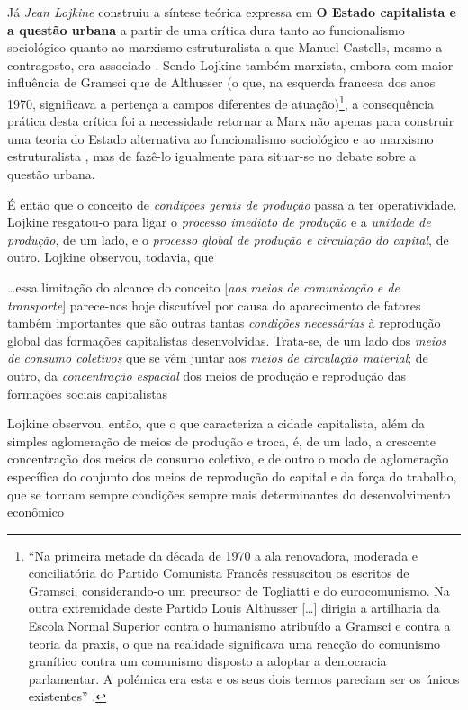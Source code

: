 Já \textit{Jean Lojkine} construiu a síntese teórica expressa em \textbf{O Estado capitalista e a questão urbana} a partir de uma crítica dura tanto ao funcionalismo sociológico quanto ao marxismo estruturalista a que Manuel Castells, mesmo a contragosto, era associado \cite[p.~79-105]{LOJKINE1997}. Sendo Lojkine também marxista, embora com maior influência de Gramsci que de Althusser (o que, na esquerda francesa dos anos 1970, significava a pertença a campos diferentes de atuação)\footnote{``Na primeira metade da década de 1970 a ala renovadora, moderada e conciliatória do Partido Comunista Francês ressuscitou os escritos de Gramsci, considerando-o um precursor de Togliatti e do eurocomunismo. Na outra extremidade deste Partido Louis Althusser [\dots] dirigia a artilharia da Escola Normal Superior contra o humanismo atribuído a Gramsci e contra a teoria da praxis, o que na realidade significava uma reacção do comunismo granítico contra um comunismo disposto a adoptar a democracia parlamentar. A polémica era esta e os seus dois termos pareciam ser os únicos existentes'' \cite{MANOLOBERNARDO2012}.}, a consequência prática desta crítica foi a necessidade retornar a Marx não apenas para construir uma teoria do Estado alternativa ao funcionalismo sociológico e ao marxismo estruturalista \cite[p.~106-141]{LOJKINE1997}, mas de fazê-lo igualmente para situar-se no debate sobre a questão urbana.

É então que o conceito de \textit{condições gerais de produção} passa a ter operatividade. Lojkine resgatou-o para ligar o \textit{processo imediato de produção} e a \textit{unidade de produção}, de um lado, e o \textit{processo global de produção e circulação do capital}, de outro. Lojkine observou, todavia, que

\begin{citacao}
\dots essa limitação do alcance do conceito [\textit{aos meios de comunicação e de transporte}] parece-nos hoje discutível por causa do aparecimento de fatores também importantes que são outras tantas \textit{condições necessárias} à reprodução global das formações capitalistas desenvolvidas. Trata-se, de um lado dos \textit{meios de consumo coletivos} que se vêm juntar aos \textit{meios de circulação material}; de outro, da \textit{concentração espacial} dos meios de produção e reprodução das formações sociais capitalistas \cite[p.~145]{LOJKINE1997}
\end{citacao}

Lojkine observou, então, que o que caracteriza a cidade capitalista, além da simples aglomeração de meios de produção e troca, é, de um lado, a crescente concentração dos meios de consumo coletivo, e de outro o modo de aglomeração específica do conjunto dos meios de reprodução do capital e da força do trabalho, que se tornam sempre condições sempre mais determinantes do desenvolvimento econômico \cite[p.~146-147]{LOJKINE1997}


